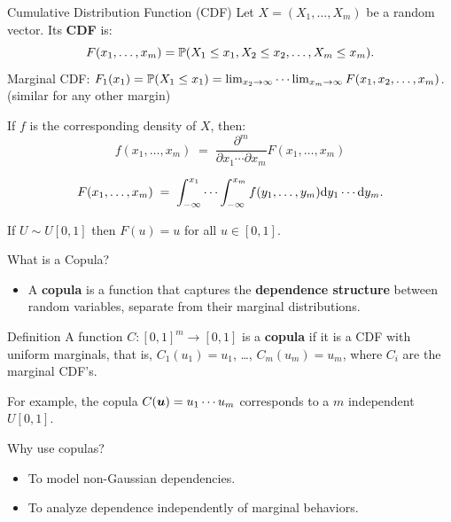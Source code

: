 \documentclass[11pt,handout,aspectratio=169]{beamer}
\begin{document}
\begin{frame}{Cumulative Distribution Function (CDF)}
	Let $X=(X_1,\ldots,X_m)$ be a random vector.  Its \textbf{CDF} is: $$F(x_1,\ldots,x_m)=\P(X_1\leq x_1,X_2\leq x_2,\ldots,X_m\leq x_m).$$
	Marginal CDF: $F_1(x_1)=\P(X_1\leq x_1)=\lim_{x_2\to \infty}\cdots\lim_{x_m\to\infty}F(x_1,x_2,\ldots,x_m)$.
	(similar for any other margin)\\[5mm]	
	\begin{block}{}
	If $f$ is the corresponding density of $X$, then:
	$$
	f(x_1,\ldots,x_m)\;=\;\frac{\partial^m}{\partial x_1\cdots\partial x_m}F(x_1,\ldots,x_m)
	$$
	
	$$
	F(x_1,\ldots,x_m)\;=\;\int_{-\infty}^{x_1}\cdots \int_{-\infty}^{x_m} f(y_1,\ldots,y_m){\rm d}y_1\cdots {\rm d} y_m. 
	$$		
	\end{block}
		If $U\sim U[0,1]$ then $F(u)=u$ for all $u\in [0,1]$.

\end{frame}


\begin{frame}{What is a Copula?}
\begin{itemize}
    \item A \textbf{copula} is a function that captures the \textbf{dependence structure} between random variables, separate from their marginal distributions.
\end{itemize}
\begin{alertblock}{Definition}
	A function $C : [0, 1]^m \to [0, 1]$ is a \textbf{copula} if it is a CDF with uniform marginals, that is, $C_1(u_1)=u_1$, \ldots, $C_m(u_m)=u_m$, where $C_i$ are the marginal CDF's.
\end{alertblock}
For example, the copula $C(\bs u)=u_1\cdots u_m$ corresponds to a $m$ independent $U[0,1]$.
\begin{block}{Why use copulas?}
	\begin{itemize}
        \item To model non-Gaussian dependencies.
        \item To analyze dependence independently of marginal behaviors.
    \end{itemize}
\end{block}
\end{frame}
\end{document}

